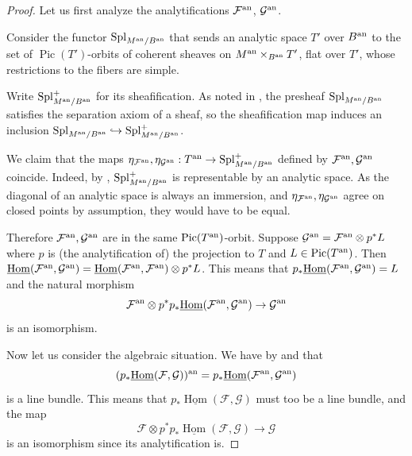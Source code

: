 \documentclass{amsart}
\theoremstyle{plain}
\theoremstyle{definition}
\theoremstyle{remark}
\begin{document}
    \begin{proof}
        Let us first analyze the analytifications $\mathcal F^{\rm an}$, $\mathcal G^{\rm an}$.

        Consider the functor $\operatorname{Spl}_{M^{\rm an}/B^{\rm an}}$ that sends an analytic space $T'$ over $B^{\rm an}$ to the set of $\operatorname{Pic}(T')$-orbits of coherent sheaves on $M^{\rm an}\times_{B^{\rm an}}T'$, flat over $T'$, whose restrictions to the fibers are simple.

        Write $\operatorname{Spl}_{M^{\rm an}/B^{\rm an}}^+$ for its sheafification.
        As noted in \cite[(6.7)]{analyticsimplesheaves}, the presheaf $\operatorname{Spl}_{M^{\rm an}/B^{\rm an}}$ satisfies the separation axiom of a sheaf, so the sheafification map induces an inclusion $\operatorname{Spl}_{M^{\rm an}/B^{\rm an}}\hookrightarrow \operatorname{Spl}_{M^{\rm an}/B^{\rm an}}^+$.

        We claim that the maps $\eta_{\mathcal F^{\rm an}},\eta_{\mathcal G^{\rm an}}:T^{\rm an}\to\operatorname{Spl}_{M^{\rm an}/B^{\rm an}}^+$ defined by $\mathcal F^{\rm an},\mathcal G^{\rm an}$ coincide.
        Indeed, by \cite[(6.4)]{analyticsimplesheaves}, $\operatorname{Spl}_{M^{\rm an}/B^{\rm an}}^+$ is representable by an analytic space.
        As the diagonal of an analytic space is always an immersion, and $\eta_{\mathcal F^{\rm an}},\eta_{\mathcal G^{\rm an}}$ agree on closed points by assumption, they would have to be equal.

        Therefore $\mathcal F^{\rm an},\mathcal G^{\rm an}$ are in the same $\operatorname{Pic}(T^{\rm an})$-orbit.
        Suppose $\mathcal G^{\rm an}=\mathcal F^{\rm an}\otimes p^\ast L$ where $p$ is (the analytification of) the projection to $T$ and $L\in\operatorname{Pic}(T^{\rm an})$.
        Then $\underline{\operatorname{Hom}}(\mathcal F^{\rm an},\mathcal G^{\rm an})=\underline{\operatorname{Hom}}(\mathcal F^{\rm an},\mathcal F^{\rm an})\otimes p^\ast L$.
        This means that $p_\ast\underline{\operatorname{Hom}}(\mathcal F^{\rm an},\mathcal G^{\rm an})=L$ and the natural morphism
        \[\mathcal F^{\rm an}\otimes p^\ast p_\ast\underline{\operatorname{Hom}}(\mathcal F^{\rm an},\mathcal G^{\rm an})\to\mathcal G^{\rm an}\]
        is an isomorphism.

        Now let us consider the algebraic situation.
        We have by \cite[Proposition 21]{gaga} and \cite[Theorem 7.1]{goodgaga} that
        \[(p_\ast\underline{\operatorname{Hom}}(\mathcal F,\mathcal G))^{\rm an}=p_\ast\underline{\operatorname{Hom}}(\mathcal F^{\rm an},\mathcal G^{\rm an})\]
        is a line bundle.
        This means that $p_\ast\underline{\operatorname{Hom}}(\mathcal F,\mathcal G)$ must too be a line bundle, and the map
        \[\mathcal F\otimes p^\ast p_\ast\underline{\operatorname{Hom}}(\mathcal F,\mathcal G)\to\mathcal G\]
        is an isomorphism since its analytification is.
    \end{proof}
\end{document}
